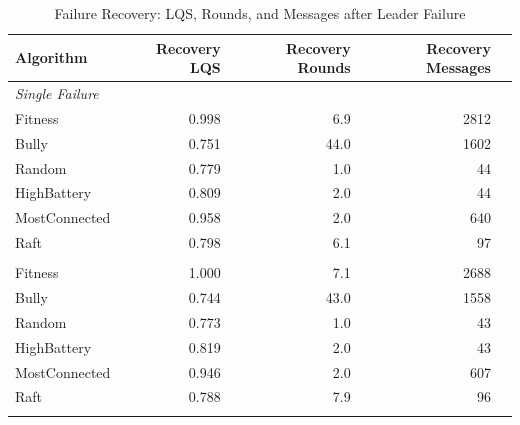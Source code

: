 \begin{table}[htbp]
\centering
\caption{Failure Recovery: LQS, Rounds, and Messages after Leader Failure}
\label{tab:recovery}
\begin{tabular}{lrrrr}
\toprule
  Algorithm & Recovery LQS & Recovery Rounds & Recovery Messages \\
\midrule
  \multicolumn{4}{l}{\textit{Single Failure}} \\
  \midrule
  Fitness & 0.998 & 6.9 & 2812 \\
  Bully & 0.751 & 44.0 & 1602 \\
  Random & 0.779 & 1.0 & 44 \\
  HighBattery & 0.809 & 2.0 & 44 \\
  MostConnected & 0.958 & 2.0 & 640 \\
  Raft & 0.798 & 6.1 & 97 \\
  \addlinespace
  \multicolumn{4}{l}{\textit{Cascaded Failure}} \\
  \midrule
  Fitness & 1.000 & 7.1 & 2688 \\
  Bully & 0.744 & 43.0 & 1558 \\
  Random & 0.773 & 1.0 & 43 \\
  HighBattery & 0.819 & 2.0 & 43 \\
  MostConnected & 0.946 & 2.0 & 607 \\
  Raft & 0.788 & 7.9 & 96 \\
  \addlinespace
\bottomrule
\end{tabular}
\end{table}